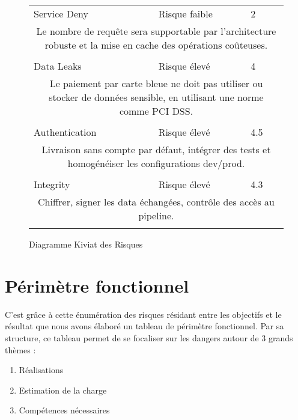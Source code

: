\documentclass[12pt]{article}
\begin{document}
\begin{landscape}
\begin{figure}[!htb]
{\begin{minipage}{0.5\columnwidth}
\begin{table}[H]
\begin{center}
\begin{tabular}{p{4cm}p{3cm}p{.5cm}}
     \\
	Service Deny\cellcolor{blue!60}&Risque faible\cellcolor{violet!60}&2\cellcolor{red!60}\\
\multicolumn{3}{c}{\parbox{7.5cm}{Le nombre de requête sera supportable par l’architecture robuste et la mise en cache des opérations coûteuses.}}\\\\
	Data Leaks\cellcolor{red!60}&Risque élevé\cellcolor{violet!60}&4\cellcolor{red!60}\\
\multicolumn{3}{c}{\parbox{7.5cm}{Le paiement par carte bleue ne doit pas utiliser ou stocker de données sensible, en utilisant une norme comme PCI DSS.}}\\\\
	Authentication\cellcolor{red!60}&Risque élevé\cellcolor{violet!60}&4.5\cellcolor{red!60}\\
\multicolumn{3}{c}{\parbox{7.5cm}{Livraison sans compte par défaut, intégrer des tests et homogénéiser les configurations dev/prod.}}\\\\
	Integrity\cellcolor{red!60}&Risque élevé\cellcolor{violet!60}&4.3\cellcolor{red!60}\\
\multicolumn{3}{c}{\parbox{7.5cm}{Chiffrer, signer les data échangées, contrôle des accès au pipeline.}}\\\\
\end{tabular}
\end{center}
\label{tab:multicol}
\end{table}	
   \end{minipage}
}   
\caption{Diagramme Kiviat des Risques}
\end{figure}

\end{landscape}
\newpage
\section{Périmètre fonctionnel}

C’est grâce à cette énumération des risques résidant entre les objectifs et le résultat que nous avons élaboré un tableau de périmètre fonctionnel.
Par sa structure, ce tableau permet de se focaliser sur les dangers autour de 3 grands thèmes :
\begin{enumerate}
	\item Réalisations
	\item Estimation de la charge
	\item Compétences nécessaires
\end{enumerate}
\end{document}

